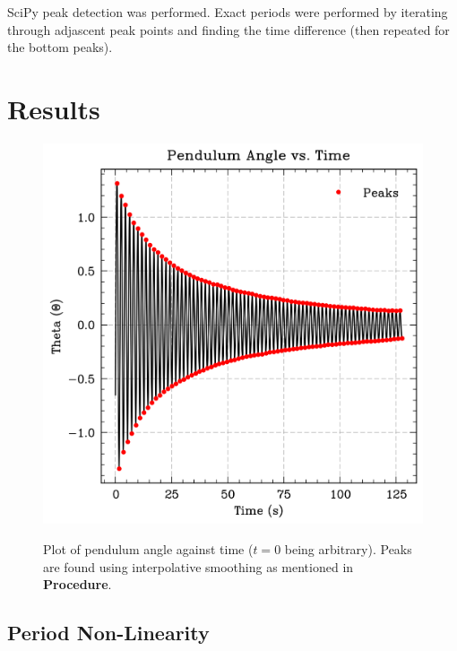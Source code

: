 \documentclass[prl,twocolumn,amsmath,amssymb,superscriptaddress]{revtex4-2}
\begin{document}
SciPy peak detection was performed. Exact periods were performed by iterating through adjascent peak points and finding the time difference (then repeated for the bottom peaks).
\newpage
\section{Results}

\begin{figure}[htb]
    \includegraphics[width=1\linewidth]{angle_time.png}
    \label{fig:angle_time}
    \caption{Plot of pendulum angle against time ($t=0$ being arbitrary). Peaks are found using interpolative smoothing as mentioned in \textbf{Procedure}.}
\end{figure}

\subsection{Period Non-Linearity}
\end{document}
